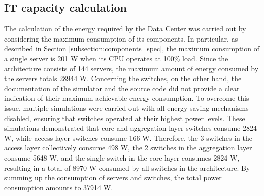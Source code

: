 \subsection{IT capacity calculation} \label{subsection:it_capacity}
The calculation of the energy required by the Data Center was carried out by considering the maximum consumption of its components. In particular, as described in Section \ref{subsection:components_spec}, the maximum consumption of a single server is 201 W when its CPU operates at 100\% load. Since the architecture consists of 144 servers, the maximum amount of energy consumed by the servers totals 28944 W. Concerning the switches, on the other hand, the documentation of the simulator and the source code did not provide a clear indication of their maximum achievable energy consumption. To overcome this issue, multiple simulations were carried out with all energy-saving mechanisms disabled, ensuring that switches operated at their highest power levels. These simulations demonstrated that core and aggregation layer switches consume 2824 W, while access layer switches consume 166 W. Therefore, the 3 switches in the access layer collectively consume 498 W, the 2 switches in the aggregation layer consume 5648 W, and the single switch in the core layer consumes 2824 W, resulting in a total of 8970 W consumed by all switches in the architecture. By summing up the consumption of servers and switches, the total power consumption amounts to 37914 W.

